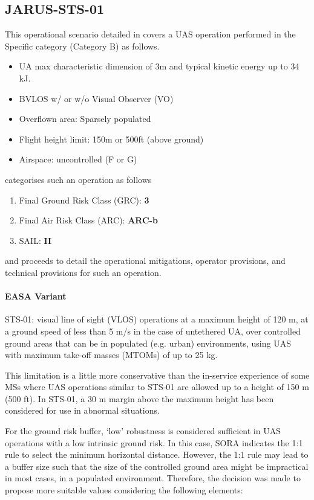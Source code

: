 \documentclass{ua_wgs_base}
\begin{document}
\subsection{JARUS-STS-01}

This operational scenario detailed in \cite{JARUS-SORA/STS-01} covers
a UAS operation performed in the Specific category (Category B) as
follows.
\begin{itemize}
\item UA max characteristic dimension of 3m and typical kinetic energy up
to 34 kJ.
\item BVLOS w/ or w/o Visual Observer (VO)
\item Overflown area: Sparsely populated
\item Flight height limit: 150m or 500ft (above ground)
\item Airspace: uncontrolled (F or G)
\end{itemize}
\cite{JARUS-SORA/JAR-DEL-WG6-D.04} categorises such an operation
as follows
\begin{enumerate}
\item Final Ground Risk Class (GRC): \textbf{3}
\item Final Air Risk Class (ARC): \textbf{ARC-b}
\item SAIL: \textbf{II}
\end{enumerate}
and proceeds to detail the operational mitigations, operator provisions,
and technical provisions for such an operation.

\paragraph{EASA Variant}

STS-01: visual line of sight (VLOS) operations at a maximum height
of 120 m, at a ground speed of less than 5 m/s in the case of untethered
UA, over controlled ground areas that can be in populated (e.g. urban)
environments, using UAS with maximum take-off masses (MTOMs) of up
to 25 kg.

This limitation is a little more conservative than the in-service
experience of some MSs where UAS operations similar to STS-01 are
allowed up to a height of 150 m (500 ft). In STS-01, a 30 m margin
above the maximum height has been considered for use in abnormal situations.

For the ground risk buffer, \textquoteleft low\textquoteright{} robustness
is considered sufficient in UAS operations with a low intrinsic ground
risk. In this case, SORA indicates the 1:1 rule to select the minimum
horizontal distance. However, the 1:1 rule may lead to a buffer size
such that the size of the controlled ground area might be impractical
\textemdash{} in most cases, in a populated environment. Therefore,
the decision was made to propose more suitable values considering
the following elements:
\end{document}
